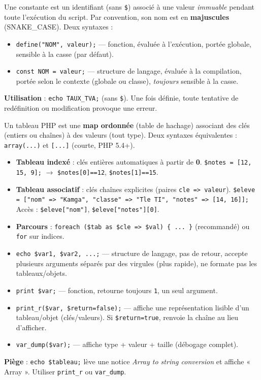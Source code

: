 \documentclass[11pt]{article}
\begin{document}
\begin{definition}
Une constante est un identifiant (sans \texttt{\$}) associé à une valeur \emph{immuable} pendant toute l'exécution du script. Par convention, son nom est en \textbf{majuscules} (SNAKE\_CASE). Deux syntaxes :
\begin{itemize}
  \item \texttt{define("NOM", valeur);} — fonction, évaluée à l'exécution, portée globale, sensible à la casse (par défaut).
  \item \texttt{const NOM = valeur;} — structure de langage, évaluée à la compilation, portée selon le contexte (globale ou classe), \emph{toujours} sensible à la casse.
\end{itemize}
\textbf{Utilisation} : \texttt{echo TAUX\_TVA;} (sans \texttt{\$}). Une fois définie, toute tentative de redéfinition ou modification provoque une erreur.
\end{definition}

\begin{propriete}
Un tableau PHP est une \textbf{map ordonnée} (table de hachage) associant des clés (entiers ou chaînes) à des valeurs (tout type). Deux syntaxes équivalentes : \texttt{array(...)} et \texttt{[...]} (courte, PHP 5.4+).
\begin{itemize}
  \item \textbf{Tableau indexé} : clés entières automatiques à partir de \textbf{0}.
        \texttt{\$notes = [12, 15, 9];} $\rightarrow$ \texttt{\$notes[0]==12}, \texttt{\$notes[1]==15}.
  \item \textbf{Tableau associatif} : clés chaînes explicites (paires \texttt{cle => valeur}).
        \texttt{\$eleve = ["nom" => "Kamga", "classe" => "Tle TI", "notes" => [14, 16]];}
        Accès : \texttt{\$eleve["nom"]}, \texttt{\$eleve["notes"][0]}.
  \item \textbf{Parcours} : \texttt{foreach (\$tab as \$cle => \$val) \{ ... \}} (recommandé) ou \texttt{for} sur indices.
\end{itemize}
\end{propriete}

\begin{propriete}
\begin{itemize}
  \item \texttt{echo \$var1, \$var2, ...;} — structure de langage, pas de retour, accepte plusieurs arguments séparés par des virgules (plus rapide), ne formate pas les tableaux/objets.
  \item \texttt{print \$var;} — fonction, retourne toujours \texttt{1}, un seul argument.
  \item \texttt{print\_r(\$var, \$return=false);} — affiche une représentation lisible d'un tableau/objet (clés/valeurs). Si \texttt{\$return=true}, renvoie la chaîne au lieu d'afficher.
  \item \texttt{var\_dump(\$var);} — affiche type + valeur + taille (débogage complet).
\end{itemize}
\textbf{Piège} : \texttt{echo \$tableau;} lève une notice \emph{Array to string conversion} et affiche « Array ». Utiliser \texttt{print\_r} ou \texttt{var\_dump}.
\end{propriete}
\end{document}
